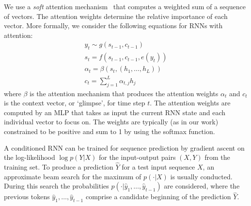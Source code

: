 \documentclass{article} \usepackage{iclr2017_conference,times}
\begin{document}
We use a \emph{soft} attention mechanism~\citep{bahdanau2015neural} that computes a weighted sum
of a sequence of vectors. The attention weights
determine the relative importance of each vector.
More formally, we consider the following equations for RNNs with attention:
\begin{align}
    y_t \sim g(s_{t-1}, c_{t-1}) \\ 
    s_t = f(s_{t-1}, c_{t-1}, e(y_t)) \\
    \alpha_t = \beta(s_t, (h_{1},\ldots,h_{L})) \\
    c_t = \sum\limits_{j=1}^L \alpha_{t,j} h_j
\end{align}   
where $\beta$ is the attention mechanism that produces the attention weights
$\alpha_t$ and $c_t$ is the context vector, or `glimpse', for time step $t$.
The attention weights are computed by an MLP that takes as input the current RNN
state and each individual vector to focus on. The weights are typically (as in
our work) constrained to be positive and sum to 1 by using the softmax function.

A conditioned RNN can be trained for sequence prediction by gradient ascent on
the log-likelihood $\log p(Y|X)$ for the input-output pairs $(X, Y)$ from the
training set. To produce a prediction $\hat{Y}$ for a test input sequence $X$, an approximate
beam search for the maximum of $p(\cdot|X)$ is usually conducted. During this
search the probabilities $p(\cdot|\hat{y}_1, \ldots, \hat{y}_{t-1})$ are considered,
where the previous tokens $\hat{y}_1, \ldots, \hat{y}_{t-1}$ comprise a candidate
beginning of the prediction $\hat{Y}$. 
\end{document}
